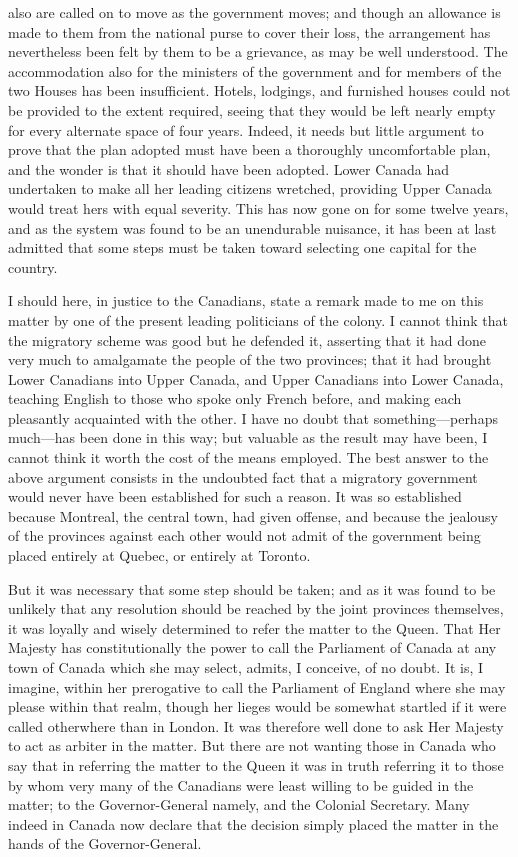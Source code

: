 also are called on to move as the government moves; and though an
allowance is made to them from the national purse to cover their
loss, the arrangement has nevertheless been felt by them to be a
grievance, as may be well understood.  The accommodation also for
the ministers of the government and for members of the two Houses
has been insufficient.  Hotels, lodgings, and furnished houses
could not be provided to the extent required, seeing that they
would be left nearly empty for every alternate space of four years.
Indeed, it needs but little argument to prove that the plan adopted
must have been a thoroughly uncomfortable plan, and the wonder is
that it should have been adopted.  Lower Canada had undertaken to
make all her leading citizens wretched, providing Upper Canada
would treat hers with equal severity.  This has now gone on for
some twelve years, and as the system was found to be an unendurable
nuisance, it has been at last admitted that some steps must be
taken toward selecting one capital for the country.

I should here, in justice to the Canadians, state a remark made to
me on this matter by one of the present leading politicians of the
colony.  I cannot think that the migratory scheme was good but he
defended it, asserting that it had done very much to amalgamate the
people of the two provinces; that it had brought Lower Canadians
into Upper Canada, and Upper Canadians into Lower Canada, teaching
English to those who spoke only French before, and making each
pleasantly acquainted with the other.  I have no doubt that
something---perhaps much---has been done in this way; but valuable as
the result may have been, I cannot think it worth the cost of the
means employed.  The best answer to the above argument consists in
the undoubted fact that a migratory government would never have
been established for such a reason.  It was so established because
Montreal, the central town, had given offense, and because the
jealousy of the provinces against each other would not admit of the
government being placed entirely at Quebec, or entirely at Toronto.

But it was necessary that some step should be taken; and as it was
found to be unlikely that any resolution should be reached by the
joint provinces themselves, it was loyally and wisely determined to
refer the matter to the Queen.  That Her Majesty has
constitutionally the power to call the Parliament of Canada at any
town of Canada which she may select, admits, I conceive, of no
doubt.  It is, I imagine, within her prerogative to call the
Parliament of England where she may please within that realm,
though her lieges would be somewhat startled if it were called
otherwhere than in London.  It was therefore well done to ask Her
Majesty to act as arbiter in the matter.  But there are not wanting
those in Canada who say that in referring the matter to the Queen
it was in truth referring it to those by whom very many of the
Canadians were least willing to be guided in the matter; to the
Governor-General namely, and the Colonial Secretary.  Many indeed
in Canada now declare that the decision simply placed the matter in
the hands of the Governor-General.

